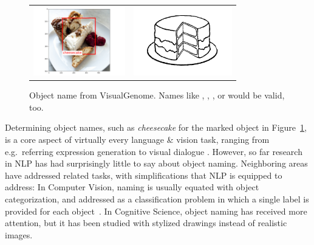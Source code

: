 \begin{figure}[tbp]
\begin{tabular}{p{2.5cm}p{2.5cm}}
\includegraphics[height=3cm]{figures/cheesecake.png} &
\includegraphics[height=3cm]{figures/snodgrass_vanderwart_cake_042.png}
\end{tabular}
\caption{Object name from VisualGenome. Names like , , , or  would be valid, too.}
\label{fig:cake}
\vspace{-0.5cm}
\end{figure}

Determining object names, such as \emph{cheesecake} for the marked object in Figure~\ref{fig:cake}, is a core aspect of virtually every language \& vision task, ranging from e.g.\ referring expression generation to visual dialogue \cite{fangetal:2015,devlin:imcaqui,Bernardietal:automatic,das2017visual,vries2017guesswhat}.
However, so far research in NLP has had surprisingly little to say about object naming.
Neighboring areas
have addressed related tasks, with simplifications that NLP is equipped to address:
In Computer Vision, naming is usually equated with object categorization, and addressed as a classification problem in which a single label is provided for each object~\cite{googlenet}.
In Cognitive Science, object naming has received more attention, but it has been studied with stylized drawings instead of realistic images.

